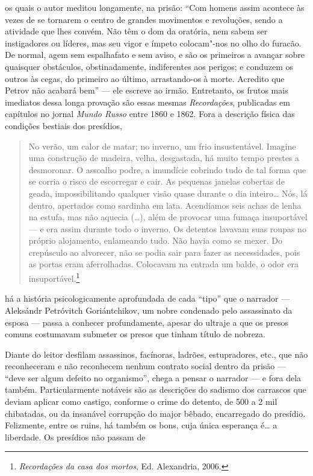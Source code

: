 os quais o autor meditou longamente, na prisão: ``Com homens assim
acontece às vezes de se tornarem o centro de grandes movimentos e
revoluções, sendo a atividade que lhes convém. Não têm o dom da
oratória, nem sabem ser instigadores ou líderes, mas seu vigor e ímpeto
colocam"-nos no olho do furacão. De normal, agem sem espalhafato e sem
aviso, e são os primeiros a avançar sobre quaisquer obstáculos,
obstinadamente, indiferentes aos perigos; e conduzem os outros às cegas,
do primeiro ao último, arrastando-os à morte. Acredito que Petrov não
acabará bem'' --- ele escreve ao irmão. Entretanto, os frutos mais
imediatos dessa longa provação são essas mesmas \emph{Recordações},
publicadas em capítulos no jornal \emph{Mundo Russo} entre 1860 e 1862.
Fora a descrição física das condições bestiais dos presídios,

\begin{quote}
No verão, um calor de matar; no inverno, um frio insustentável.
Imagine uma construção de madeira, velha, desgastada, há muito tempo
prestes a desmoronar. O assoalho podre, a imundície cobrindo tudo de tal
forma que se corria o risco de escorregar e cair. As pequenas janelas
cobertas de geada, impossibilitando qualquer visão quase durante o dia
inteiro\ldots{} Nós, lá dentro, apertados como sardinha em lata. Acendíamos
seis achas de lenha na estufa, mas não aquecia (\ldots{}), além de provocar
uma fumaça insuportável --- e era assim durante todo o inverno. Os
detentos lavavam suas roupas no próprio alojamento, enlameando tudo. Não
havia como se mexer. Do crepúsculo ao alvorecer, não se podia sair para
fazer as necessidades, pois as portas eram aferrolhadas. Colocavam na
entrada um balde, o odor era insuportável.\footnote{\emph{Recordações da
casa dos mortos}, Ed. Alexandria, 2006.}
\end{quote}

há a história psicologicamente aprofundada de cada ``tipo'' que o narrador
--- Aleksándr Petróvitch Goriántchikov, um nobre condenado pelo assassinato
da esposa --- passa a conhecer profundamente, apesar do ultraje a que
os presos comuns costumavam submeter os presos que tinham título de
nobreza.

Diante do leitor desfilam assassinos, facínoras, ladrões, estupradores,
etc., que não reconheceram e não reconhecem nenhum contrato social
dentro da prisão --- ``deve ser algum defeito no organismo'', chega a
pensar o narrador --- e fora dela também. Particularmente notáveis são as
descrições do sadismo dos carrascos que deviam aplicar como
castigo, conforme o crime do detento, de 500 a 2 mil chibatadas, ou da
insanável corrupção do major bêbado, encarregado do presídio. Felizmente,
entre os ruins, há também os bons, cuja única esperança é\ldots{} a liberdade.
Os presídios não passam de


